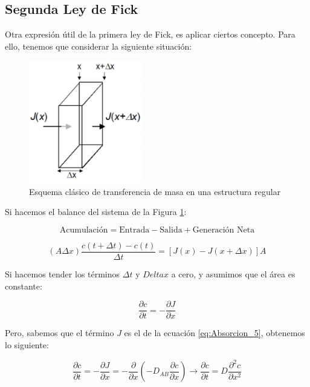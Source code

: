 \documentclass[11pt]{book}
\begin{document}
\subsection{Segunda Ley de Fick}

Otra expresión útil de la primera ley de Fick, es aplicar ciertos concepto. Para ello, tenemos que considerar la siguiente situación:

\begin{figure}[H]
    \centering
    \includegraphics[width = 5cm]{img/absorcion/Absorcion_1.PNG}
    \caption{Esquema clásico de transferencia de masa en una estructura regular}
    \label{fig:Absorcion_1}
\end{figure}

Si hacemos el balance del sistema de la Figura \ref{fig:Absorcion_1}:

\begin{equation*}
    \textrm{Acumulación} = \textrm{Entrada} - \textrm{Salida} + \textrm{Generación Neta}
\end{equation*}

\begin{equation}
    \label{eq:Absorcion_6}
    (A \Delta x) \frac{c(t+\Delta t) - c(t)}{\Delta t} = [J(x)-J(x+\Delta x)] A
\end{equation}

Si hacemos tender los términos $\Delta t$ y $Delta x$ a cero, y asumimos que el área es constante:

\begin{equation}
    \label{eq:Absorcion_7}
    \frac{\partial c}{\partial t} = -\frac{\partial J}{\partial x}
\end{equation}

Pero, sabemos que el término $J$ es el de la ecuación \ref{eq:Absorcion_5}, obtenemos lo siguiente:

\begin{equation}
    \label{eq:Absorcion_8}
    \frac{\partial c}{\partial t} = -\frac{\partial J}{\partial x} = - \frac{\partial}{\partial x} \left( -D_{AB} \frac{\partial c}{\partial x} \right)  \rightarrow \frac{\partial c}{\partial t} = D \frac{\partial^2 c}{\partial x^2}
\end{equation}
\end{document}
